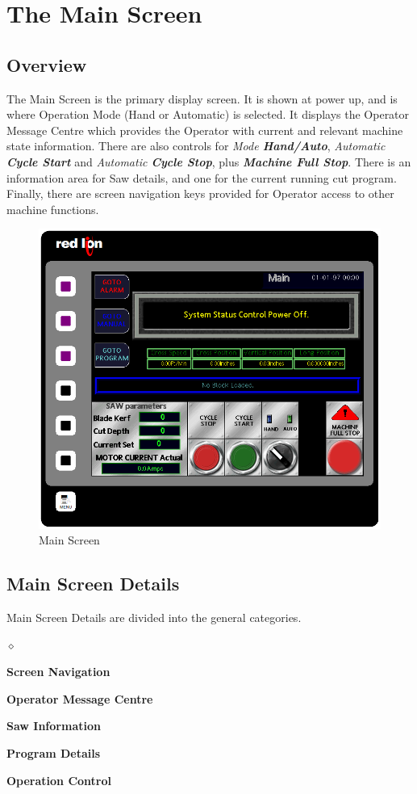 \chapter{The Main Screen}
\section{Overview}
The Main Screen is the primary display screen. It is shown at power up, and is where Operation Mode (Hand or Automatic) is selected. It displays the Operator Message Centre which provides the Operator with current and relevant machine state information. There are also controls for \textit{Mode \textbf{Hand/Auto}}, \textit{Automatic \textbf{Cycle Start}} and \textit{Automatic \textbf{Cycle Stop}}, plus \textbf{\textit{Machine Full Stop}}. There is an information area for Saw details, and one for the current running cut program. Finally, there are screen navigation keys provided for Operator access to other machine functions.
\begin{figure}
	\centering
	\includegraphics[width=0.5\linewidth]{screen-captures/main/main-full}
	\caption{Main Screen}
	\label{fig:main-screen}
\end{figure}
\pagebreak
\section{Main Screen Details}
Main Screen Details are divided into the general categories.
\begin{list}{$\diamond$}{}
	\item \textbf{Screen Navigation}
	\item \textbf{Operator Message Centre}
	\item \textbf{Saw Information}
	\item \textbf{Program Details}
	\item \textbf{Operation Control}
\end{list}
